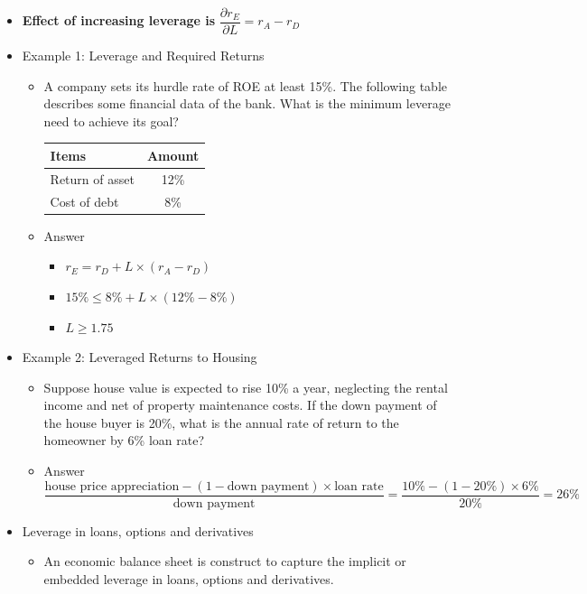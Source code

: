 \begin{itemize}
\item \textbf{Effect of increasing leverage is} $\dfrac{\partial r_E}{\partial L} = r_A - r_D$
\item Example 1: Leverage and Required Returns
    \begin{itemize}
    \item A company sets its hurdle rate of ROE at least 15\%. The following table describes some financial data of the bank. What is the minimum leverage need to achieve its goal?
    \begin{table}[htbp]
        \centering
        \begin{tabular}{|l|c|}
        \hline
        Items & Amount \\
        \hline
        Return of asset & 12\% \\
        \hline
        Cost of debt & 8\% \\
        \hline
        \end{tabular}
        \end{table}
    \item Answer
        \begin{itemize}
            \item $r_E = r_D + L \times (r_A - r_D)$
            \item $15\% \leq 8\% + L \times (12\% - 8\%)$
            \item $L \geq 1.75$
        \end{itemize}
    \end{itemize}
\item Example 2: Leveraged Returns to Housing
    \begin{itemize}
    \item Suppose house value is expected to rise 10\% a year, neglecting the rental income and net of property maintenance costs. If the down payment of the house buyer is 20\%, what is the annual rate of return to the homeowner by 6\% loan rate?
    \item Answer
    \[
\frac{\text{house price appreciation} - (1 - \text{down payment}) \times \text{loan rate}}{\text{down payment}}
=
\frac{10\% - (1 - 20\%) \times 6\%}{20\%} = 26\%
\]
    \end{itemize}
\item Leverage in loans, options and derivatives
    \begin{itemize}
    \item An economic balance sheet is construct to capture the implicit or embedded leverage in loans, options and derivatives.
    \end{itemize}   
\end{itemize}



